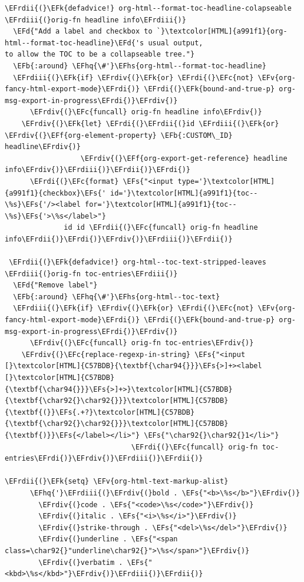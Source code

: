 \documentclass{scrartcl}
\newcommand{\EFk}[1]{\textcolor{EFk}{#1}} %
\newcommand{\EFd}[1]{\textcolor{EFd}{#1}} %
\newcommand{\EFs}[1]{\textcolor{EFs}{#1}} %
\newcommand{\EFb}[1]{\textcolor{EFb}{#1}} %
\newcommand{\EFc}[1]{\textcolor{EFc}{#1}} %
\newcommand{\EFv}[1]{\textcolor{EFv}{#1}} %
\newcommand{\EFf}[1]{\textcolor{EFf}{#1}} %
\newcommand{\EFhq}[1]{#1} %
\newcommand{\EFhs}[1]{#1} %
\newcommand{\EFrdi}[1]{#1} %
\newcommand{\EFrdii}[1]{#1} %
\newcommand{\EFrdiii}[1]{#1} %
\newcommand{\EFrdiv}[1]{#1} %
\begin{document}
\begin{Code}
\begin{Verbatim}[]
\EFrdii{(}\EFk{defadvice!} org-html--format-toc-headline-colapseable \EFrdiii{(}orig-fn headline info\EFrdiii{)}
  \EFd{"Add a label and checkbox to `}\textcolor[HTML]{a991f1}{org-html--format-toc-headline}\EFd{'s usual output,
to allow the TOC to be a collapseable tree."}
  \EFb{:around} \EFhq{\#'}\EFhs{org-html--format-toc-headline}
  \EFrdiii{(}\EFk{if} \EFrdiv{(}\EFk{or} \EFrdi{(}\EFc{not} \EFv{org-fancy-html-export-mode}\EFrdi{)} \EFrdi{(}\EFk{bound-and-true-p} org-msg-export-in-progress\EFrdi{)}\EFrdiv{)}
      \EFrdiv{(}\EFc{funcall} orig-fn headline info\EFrdiv{)}
    \EFrdiv{(}\EFk{let} \EFrdi{(}\EFrdii{(}id \EFrdiii{(}\EFk{or} \EFrdiv{(}\EFf{org-element-property} \EFb{:CUSTOM\_ID} headline\EFrdiv{)}
                  \EFrdiv{(}\EFf{org-export-get-reference} headline info\EFrdiv{)}\EFrdiii{)}\EFrdii{)}\EFrdi{)}
      \EFrdi{(}\EFc{format} \EFs{"<input type='}\textcolor[HTML]{a991f1}{checkbox}\EFs{' id='}\textcolor[HTML]{a991f1}{toc--\%s}\EFs{'/><label for='}\textcolor[HTML]{a991f1}{toc--\%s}\EFs{'>\%s</label>"}
              id id \EFrdii{(}\EFc{funcall} orig-fn headline info\EFrdii{)}\EFrdi{)}\EFrdiv{)}\EFrdiii{)}\EFrdii{)}

 \EFrdii{(}\EFk{defadvice!} org-html--toc-text-stripped-leaves \EFrdiii{(}orig-fn toc-entries\EFrdiii{)}
  \EFd{"Remove label"}
  \EFb{:around} \EFhq{\#'}\EFhs{org-html--toc-text}
  \EFrdiii{(}\EFk{if} \EFrdiv{(}\EFk{or} \EFrdi{(}\EFc{not} \EFv{org-fancy-html-export-mode}\EFrdi{)} \EFrdi{(}\EFk{bound-and-true-p} org-msg-export-in-progress\EFrdi{)}\EFrdiv{)}
      \EFrdiv{(}\EFc{funcall} orig-fn toc-entries\EFrdiv{)}
    \EFrdiv{(}\EFc{replace-regexp-in-string} \EFs{"<input [}\textcolor[HTML]{C57BDB}{\textbf{\char94{}}}\EFs{>]+><label [}\textcolor[HTML]{C57BDB}{\textbf{\char94{}}}\EFs{>]+>}\textcolor[HTML]{C57BDB}{\textbf{\char92{}\char92{}}}\textcolor[HTML]{C57BDB}{\textbf{(}}\EFs{.+?}\textcolor[HTML]{C57BDB}{\textbf{\char92{}\char92{}}}\textcolor[HTML]{C57BDB}{\textbf{)}}\EFs{</label></li>"} \EFs{"\char92{}\char92{}1</li>"}
                              \EFrdi{(}\EFc{funcall} orig-fn toc-entries\EFrdi{)}\EFrdiv{)}\EFrdiii{)}\EFrdii{)}

\EFrdii{(}\EFk{setq} \EFv{org-html-text-markup-alist}
      \EFhq{'}\EFrdiii{(}\EFrdiv{(}bold . \EFs{"<b>\%s</b>"}\EFrdiv{)}
        \EFrdiv{(}code . \EFs{"<code>\%s</code>"}\EFrdiv{)}
        \EFrdiv{(}italic . \EFs{"<i>\%s</i>"}\EFrdiv{)}
        \EFrdiv{(}strike-through . \EFs{"<del>\%s</del>"}\EFrdiv{)}
        \EFrdiv{(}underline . \EFs{"<span class=\char92{}"underline\char92{}">\%s</span>"}\EFrdiv{)}
        \EFrdiv{(}verbatim . \EFs{"<kbd>\%s</kbd>"}\EFrdiv{)}\EFrdiii{)}\EFrdii{)}


\end{Verbatim}
\end{Code}
\end{document}
